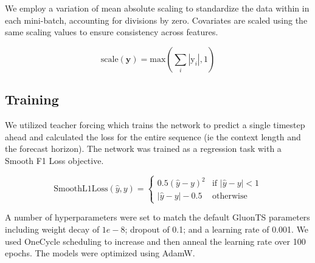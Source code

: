 \documentclass{article}
\begin{document}
We employ a variation of mean absolute scaling to standardize the data within in each mini-batch, 
accounting for divisions by zero. 
Covariates are scaled using the same scaling values to ensure consistency across features.

\begin{equation}
\text{scale}(\mathbf{y}) = 
\text{max}({{\sum_{i} |\text{y}_{i}|}},  1)
\end{equation}
  




\subsection{Training}
We utilized teacher forcing which trains the network to predict a single
timestep ahead and calculated the loss for the entire sequence (ie the context length and the forecast horizon).
The network was trained as a regression task with a Smooth F1 Loss objective.
%

\begin{equation}
\text{SmoothL1Loss}(\hat{y}, y) = 
\begin{cases} 
0.5(\hat{y} - y)^2 & \text{if } |\hat{y} - y| < 1 \\
|\hat{y} - y| - 0.5 & \text{otherwise}
\end{cases}
\end{equation}

A number of hyperparameters were set to match the default
GluonTS parameters \cite{gluonts_arxiv} including weight decay \cite{loshchilov2019decoupled} of $1e-8$; dropout 
\cite{hinton2012improving} of 0.1; and a learning rate of 0.001. We used OneCycle \cite{smith2018superconvergence} scheduling to increase and then 
anneal the learning rate over 100 epochs. The models were optimized using AdamW.
\end{document}
